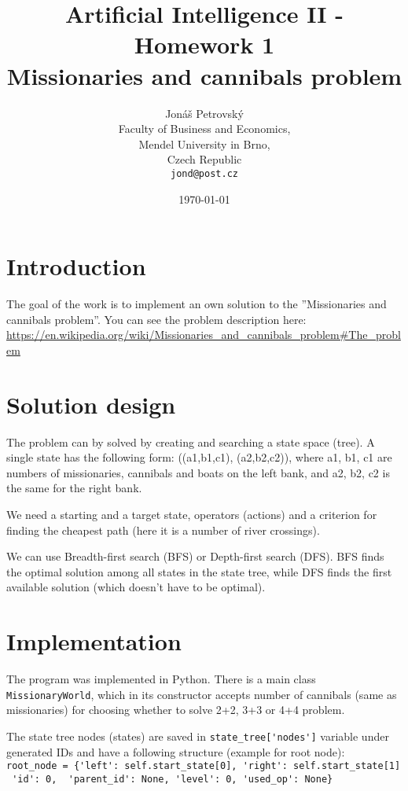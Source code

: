 \documentclass{article}
\begin{document}
\title{Artificial Intelligence II - Homework 1 \\ Missionaries and cannibals problem}
\author{Jonáš Petrovský\\
        Faculty of Business and Economics,\\
		Mendel University in Brno,\\
		Czech Republic \\
		\texttt{jond@post.cz}}  %
\date{\today}  %
\maketitle

\section{Introduction}
The goal of the work is to implement an own solution to the ''Missionaries and cannibals problem''. You can see the problem description here: \url{https://en.wikipedia.org/wiki/Missionaries_and_cannibals_problem#The_problem}

\section{Solution design}
The problem can by solved by creating and searching a state space (tree). A single state has the following form:
((a1,b1,c1), (a2,b2,c2)), where a1, b1, c1 are numbers of missionaries, cannibals and boats on the left bank, and a2, b2, c2 is the same for the right bank.    

We need a starting and a target state, operators (actions) and a criterion for finding the cheapest path (here it is a number of river crossings).

We can use Breadth-first search (BFS) or Depth-first search (DFS). BFS finds the optimal solution among all states in the state tree, while DFS finds the first available solution (which doesn't have to be optimal).  

\section{Implementation}
The program was implemented in Python. There is a main class \texttt{MissionaryWorld}, which in its constructor accepts number of cannibals (same as missionaries) for choosing whether to solve 2+2, 3+3 or 4+4 problem. 

The state tree nodes (states) are saved in \verb|state_tree['nodes']| variable under generated IDs and have a following structure (example for root node): \\
\verb|root_node = {'left': self.start_state[0], 'right': self.start_state[1]| \\
\verb| 'id': 0,  'parent_id': None, 'level': 0, 'used_op': None}|
\end{document}
